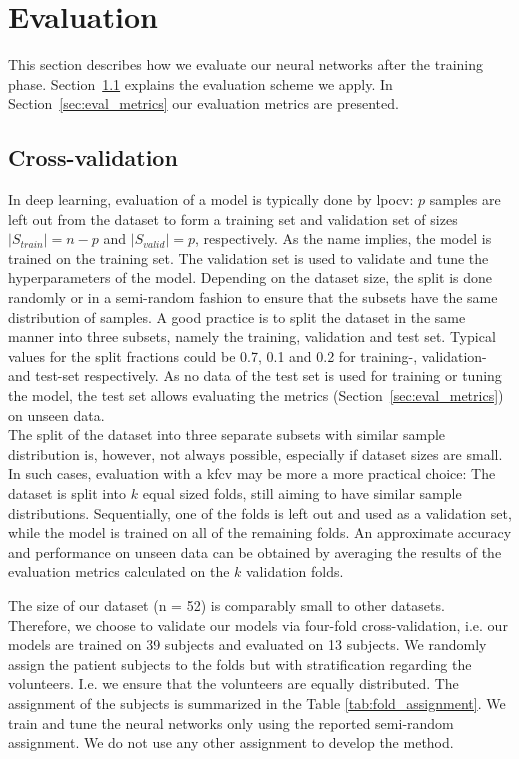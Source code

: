 \section{Evaluation} \label{sec:evaluation}
This section describes how we evaluate our neural networks after the training phase. Section~\ref{sec:eval_cross} explains the evaluation scheme we apply. In Section~\ref{sec:eval_metrics} our evaluation metrics are presented.

\subsection{Cross-validation} \label{sec:eval_cross}
In deep learning, evaluation of a model is typically done by \gls{lpocv}: $p$ samples are left out from the dataset to form a training set and validation set of sizes $|S_{train}| = n - p$ and $|S_{valid}| = p$, respectively. As the name implies, the model is trained on the training set. The validation set is used to validate and tune the hyperparameters of the model.
Depending on the dataset size, the split is done randomly or in a semi-random fashion to ensure that the subsets have the same distribution of samples.
A good practice is to split the dataset in the same manner into three subsets, namely the training, validation and test set. Typical values for the split fractions could be 0.7, 0.1 and 0.2 for training-, validation- and test-set respectively. As no data of the test set is used for training or tuning the model, the test set allows evaluating the metrics (Section~\ref{sec:eval_metrics}) on unseen data. \\
The split of the dataset into three separate subsets with similar sample distribution is, however, not always possible, especially if dataset sizes are small. In such cases, evaluation with a \gls{kfcv} may be more a more practical choice: The dataset is split into $k$ equal sized folds, still aiming to have similar sample distributions. Sequentially, one of the folds is left out and used as a validation set, while the model is trained on all of the remaining folds. An approximate accuracy and performance on unseen data can be obtained by averaging the results of the evaluation metrics calculated on the $k$ validation folds.

The size of our dataset (n = 52) is comparably small to other datasets. Therefore, we choose to validate our models via four-fold cross-validation, i.e. our models are trained on 39 subjects and evaluated on 13 subjects. We randomly assign the patient subjects to the folds but with stratification regarding the volunteers. I.e. we ensure that the volunteers are equally distributed. The assignment of the subjects is summarized in the Table \ref{tab:fold_assignment}. We train and tune the neural networks only using the reported semi-random assignment. We do not use any other assignment to develop the method.

